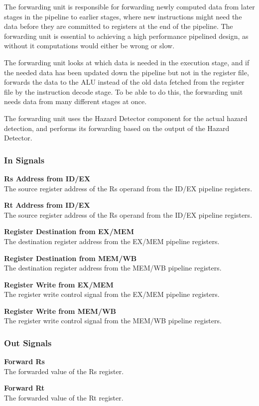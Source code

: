 The forwarding unit is responsible for forwarding newly computed data from later stages in the pipeline to earlier stages, where new instructions might need the data before they are committed to registers at the end of the pipeline.
The forwarding unit is essential to achieving a high performance pipelined design, as without it computations would either be wrong or slow.

The forwarding unit looks at which data is needed in the execution stage, and if the needed data has been updated down the pipeline but not in the register file, forwards the data to the ALU instead of the old data fetched from the register file by the instruction decode stage.
To be able to do this, the forwarding unit needs data from many different stages at once.

The forwarding unit uses the Hazard Detector component for the actual hazard detection, and performs its forwarding based on the output of the Hazard Detector.

\subsubsection{In Signals}

\begin{description}
\item{\textbf{Rs Address from ID/EX }} \\
    The source register address of the Rs operand from the ID/EX pipeline registers.

\item{\textbf{Rt Address from ID/EX}} \\
    The source register address of the Rs operand from the ID/EX pipeline registers.

\item{\textbf{Register Destination from EX/MEM}} \\
    The destination register address from the EX/MEM pipeline registers.

\item{\textbf{Register Destination from MEM/WB}} \\
    The destination register address from the MEM/WB pipeline registers.

\item{\textbf{Register Write from EX/MEM}} \\
    The register write control signal from the EX/MEM pipeline registers.

\item{\textbf{Register Write from MEM/WB}} \\
    The register write control signal from the MEM/WB pipeline registers.
\end{description}

\subsubsection{Out Signals}

\begin{description}
\item{\textbf{Forward Rs}} \\
    The forwarded value of the Rs register.

\item{\textbf{Forward Rt}} \\
    The forwarded value of the Rt register.

\end{description}
